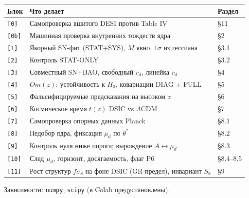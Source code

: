\documentclass{article}
\begin{document}
\begin{center}
\small
\begin{tabularx}{\textwidth}{@{}l >{\raggedright\arraybackslash}X l@{}}
\toprule
\textbf{Блок} & \textbf{Что делает} & \textbf{Раздел} \\
\midrule
\texttt{[0]} & Самопроверка вшитого DESI против Table IV & \S11 \\
\texttt{[0b]} & Машинная проверка внутренних тождеств ядра & \S2 \\
\texttt{[1]} & Якорный SN-фит (STAT+SYS), $M$ явно, $1\sigma$ из гессиана & \S3.1 \\
\texttt{[2]} & Контроль STAT-ONLY & \S3.2 \\
\texttt{[3]} & Совместный SN+BAO, свободный $r_d$, линейка $r_d$ & \S4 \\
\texttt{[4]} & $Om(z)$: устойчивость к $H_0$, ковариации DIAG + FULL & \S5 \\
\texttt{[5]} & Фальсифицируемые предсказания на высоком $z$ & \S6 \\
\texttt{[6]} & Космическое время $t(z)$ DSIC vs $\Lambda$CDM & \S7 \\
\texttt{[7]} & Самопроверка опорных данных Planck & \S8.1 \\
\texttt{[8]} & Недобор ядра, фиксация $\mu_d$ по $\theta^*$ & \S8.2 \\
\texttt{[9]} & Контроль нуля ниже порога; вырождение $A \leftrightarrow \mu_d$ & \S8.3 \\
\texttt{[10]} & След $\mu_d$, горизонт, досягаемость, флаг P6 & \S8.4--8.5 \\
\texttt{[11]} & Рост структур $f\sigma_8$ на фоне DSIC (GR-предел), инвариант $S_8$ & \S9 \\
\bottomrule
\end{tabularx}
\end{center}

Зависимости: \texttt{numpy}, \texttt{scipy} (в Colab предустановлены).
\end{document}
